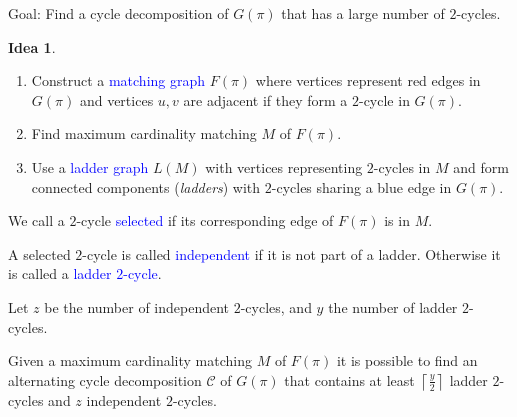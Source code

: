 \documentclass[handout]{beamer}
\theoremstyle{definition}
\newtheorem{idea}[theorem]{Idea}
\def\padding{\vspace{0.5cm}}
\def\spadding{\vspace{0.25cm}}
\def\b{\textcolor{blue}}
\begin{document}
\begin{frame}

Goal: Find a cycle decomposition of $G(\pi)$ that has a large number of $2$-cycles.\pause

\begin{idea}
\begin{enumerate}
    \item Construct a \b{matching graph} $F(\pi)$ where vertices represent red edges in $G(\pi)$ and vertices $u, v$ are adjacent if they form a $2$-cycle in $G(\pi)$. \par\pause
    \item Find maximum cardinality matching $M$ of $F(\pi)$.\pause
    \item Use a \b{ladder graph} $L(M)$ with vertices representing $2$-cycles in $M$ and form connected components (\textit{ladders}) with $2$-cycles sharing a blue edge in $G(\pi)$.
\end{enumerate}
\end{idea}

\end{frame}

\begin{frame}

\begin{definition}
We call a $2$-cycle \b{selected} if its corresponding edge of $F(\pi)$ is in $M$.\pause\spadding

A selected $2$-cycle is called \b{independent} if it is not part of a ladder. Otherwise it is called a \b{ladder $2$-cycle}.
\end{definition}\pause\padding

Let $z$ be the number of independent $2$-cycles, and $y$ the number of ladder $2$-cycles.\pause

\begin{theorem}
\label{thm:5}
Given a maximum cardinality matching $M$ of $F(\pi)$ it is possible to find an alternating cycle decomposition $\mathcal{C}$ of $G(\pi)$ that contains at least $\left\lceil \frac{y}{2} \right\rceil$ ladder $2$-cycles and $z$ independent $2$-cycles.
\end{theorem}


\end{frame}
\end{document}
